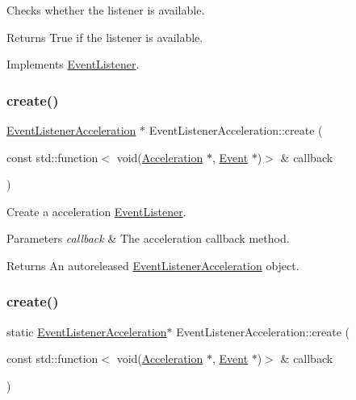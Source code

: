 Checks whether the listener is available.

\begin{DoxyReturn}{Returns}
True if the listener is available. 
\end{DoxyReturn}


Implements \hyperlink{classEventListener_adf9e4eb37ea6e94c05f4d1b6594bd35e}{Event\+Listener}.

\mbox{\label{classEventListenerAcceleration_a6d795a6b7fd3ebe2d9f8e463877227f5}} 
\subsubsection{\texorpdfstring{create()}{create()}\hspace{0.1cm}{\footnotesize\ttfamily [1/2]}}
{\footnotesize\ttfamily \hyperlink{classEventListenerAcceleration}{Event\+Listener\+Acceleration} $\ast$ Event\+Listener\+Acceleration\+::create (\begin{DoxyParamCaption}\item[{const std\+::function$<$ void(\hyperlink{classAcceleration}{Acceleration} $\ast$, \hyperlink{classEvent}{Event} $\ast$)$>$ \&}]{callback }\end{DoxyParamCaption})\hspace{0.3cm}{\ttfamily [static]}}

Create a acceleration \hyperlink{classEventListener}{Event\+Listener}.


\begin{DoxyParams}{Parameters}
{\em callback} & The acceleration callback method. \\
\hline
\end{DoxyParams}
\begin{DoxyReturn}{Returns}
An autoreleased \hyperlink{classEventListenerAcceleration}{Event\+Listener\+Acceleration} object. 
\end{DoxyReturn}
\mbox{\label{classEventListenerAcceleration_ad1f824d5c1bc1f19d7464c00e41ac587}} 
\subsubsection{\texorpdfstring{create()}{create()}\hspace{0.1cm}{\footnotesize\ttfamily [2/2]}}
{\footnotesize\ttfamily static \hyperlink{classEventListenerAcceleration}{Event\+Listener\+Acceleration}$\ast$ Event\+Listener\+Acceleration\+::create (\begin{DoxyParamCaption}\item[{const std\+::function$<$ void(\hyperlink{classAcceleration}{Acceleration} $\ast$, \hyperlink{classEvent}{Event} $\ast$)$>$ \&}]{callback }\end{DoxyParamCaption})\hspace{0.3cm}{\ttfamily [static]}}

